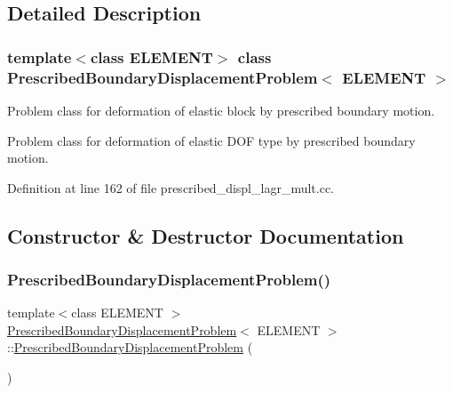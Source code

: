 \subsection{Detailed Description}
\subsubsection*{template$<$class E\+L\+E\+M\+E\+NT$>$\newline
class Prescribed\+Boundary\+Displacement\+Problem$<$ E\+L\+E\+M\+E\+N\+T $>$}

Problem class for deformation of elastic block by prescribed boundary motion.

Problem class for deformation of elastic D\+OF type by prescribed boundary motion. 

Definition at line 162 of file prescribed\+\_\+displ\+\_\+lagr\+\_\+mult.\+cc.



\subsection{Constructor \& Destructor Documentation}
\mbox{\label{classPrescribedBoundaryDisplacementProblem_ac0c8b47eeb75ba2c618757e6b56e62dc}} 
\subsubsection{\texorpdfstring{Prescribed\+Boundary\+Displacement\+Problem()}{PrescribedBoundaryDisplacementProblem()}\hspace{0.1cm}{\footnotesize\ttfamily [1/3]}}
{\footnotesize\ttfamily template$<$class E\+L\+E\+M\+E\+NT $>$ \\
\hyperlink{classPrescribedBoundaryDisplacementProblem}{Prescribed\+Boundary\+Displacement\+Problem}$<$ E\+L\+E\+M\+E\+NT $>$\+::\hyperlink{classPrescribedBoundaryDisplacementProblem}{Prescribed\+Boundary\+Displacement\+Problem} (\begin{DoxyParamCaption}{ }\end{DoxyParamCaption})}




